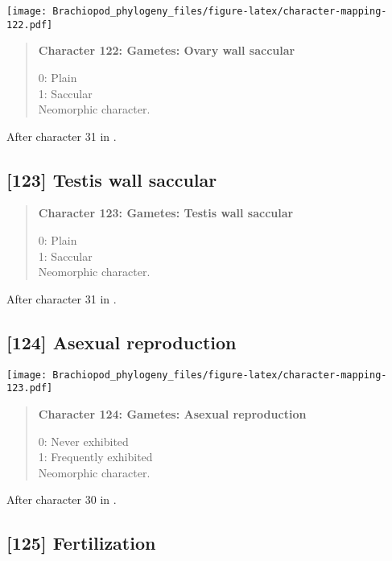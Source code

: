 \documentclass[openany]{book}
\theoremstyle{definition}
\theoremstyle{definition}
\theoremstyle{definition}
\theoremstyle{remark}
\begin{document}
\texttt{[image: Brachiopod\_phylogeny\_files/figure-latex/character-mapping-122.pdf]}

\begin{quote}
\textbf{Character 122: Gametes: Ovary wall saccular}

0: Plain\\
1: Saccular\\
Neomorphic character.
\end{quote}

After character 31 in \citet{Haszprunar1996}.

\subsection*{{[}123{]} Testis wall saccular}\label{testis-wall-saccular}

\begin{quote}
\textbf{Character 123: Gametes: Testis wall saccular}

0: Plain\\
1: Saccular\\
Neomorphic character.
\end{quote}

After character 31 in \citet{Haszprunar1996}.

\subsection*{{[}124{]} Asexual reproduction}\label{asexual-reproduction}

\texttt{[image: Brachiopod\_phylogeny\_files/figure-latex/character-mapping-123.pdf]}

\begin{quote}
\textbf{Character 124: Gametes: Asexual reproduction}

0: Never exhibited\\
1: Frequently exhibited\\
Neomorphic character.
\end{quote}

After character 30 in \citet{Haszprunar1996}.

\subsection*{{[}125{]} Fertilization}\label{fertilization}
\end{document}
